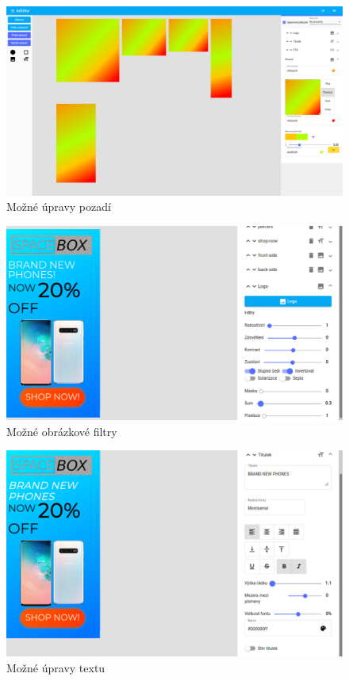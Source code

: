 \documentclass[czech,bachelor]{diploma}
\begin{document}
\begin{figure}[h]
    \includegraphics[width=1.0\textwidth]{Figures/editor/upravy-pozadi.png}
    \caption{Možné úpravy pozadí}
    \label{fig:editor:backgrounds}
\end{figure}

\begin{figure}[h]
    \includegraphics[width=1.0\textwidth]{Figures/editor/obrazkove-filtry.png}
    \caption{Možné obrázkové filtry}
    \label{fig:editor:filters}
\end{figure}


\begin{figure}[h]
    \includegraphics[width=1.0\textwidth]{Figures/editor/upravy-textu.png}
    \caption{Možné úpravy textu}
    \label{fig:editor:text-edit}
\end{figure}
\end{document}
